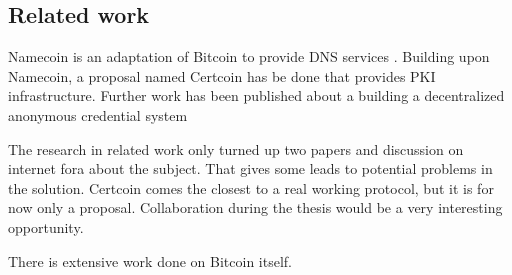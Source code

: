 \subsection*{Related work}
Namecoin is an adaptation of Bitcoin to provide DNS services \cite{Namecoin}.
Building upon Namecoin, a proposal named Certcoin has be done that provides PKI infrastructure\cite{fromknecht2014certcoin}.
Further work has been published about a building a decentralized anonymous credential system\cite{garmandecentralized}

The research in related work only turned up two papers and discussion on internet fora about the subject.
That gives some leads to potential problems in the solution.
Certcoin comes the closest to a real working protocol,
but it is for now only a proposal. 
Collaboration during the thesis would be a very interesting opportunity.

There is extensive work done on Bitcoin itself.

